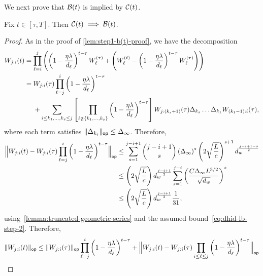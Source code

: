We next prove that $\cB(t)$ is implied by $\cC(t)$.
\begin{lemma}
  Fix $t \in [\tau, T]$. Then $\cC(t) \implies \cB(t)$.
\end{lemma}
\begin{proof}
As in the proof of \cref{lem:step1-b(t)-proof}, we have the decomposition
\begin{align*}
  W_{j:i}(t) & =
  \prod_{\ell = i}^j \left(\left(1 - \frac{\eta \lambda}{d_{\ell}}\right)^{t - \tau} W_{\ell}^{(\tau)} + \left(W_{\ell}^{(t)} - \left(1 - \frac{\eta \lambda}{d_{\ell}}\right)^{t - \tau} W_{\ell}^{(\tau)} \right)\right) \\
  &=
  \begin{aligned}[t]
    & W_{j:i}(\tau) \prod_{\ell = j}^{i} \left(1 - \frac{\eta \lambda}{d_{\ell}}\right)^{t - \tau} \\ 
    & + \sum_{i \leq k_1, \dots, k_s \leq j} \left[ \prod_{\ell \notin \set{k_1, \dots, k_{s}}} \left(1 - \frac{\eta \lambda}{d_{\ell}}\right)^{t - \tau} \right] W_{j:(k_s + 1)}(\tau) \Delta_{k_s}
		\dots \Delta_{k_1} W_{(k_1 - 1):i}(\tau),
  \end{aligned}
\end{align*}
where each term satisfies $\opnorm{\Delta_{k_{i}}} \leq \Delta_{\infty}$. Therefore,
\begin{align}
  \opnorm[\Big]{W_{j:i}(t) - W_{j:i}(\tau) \prod_{\ell = j}^{i} \left(1 - \frac{\eta \lambda}{d_{\ell}}\right)^{t - \tau}} & \leq
  \sum_{s = 1}^{j-i+1} \binom{j-i+1}{s} \left(\Delta_{\infty}\right)^{s} \left(2 \sqrt{\frac{L}{c}}\right)^{s+1} d_w^{\frac{j-i+1-s}{2}}                                                  \notag \\
		                                     & \leq
		\left(2\sqrt{\frac{L}{c}}\right) d_w^{\frac{j-i+1}{2}}
    \sum_{s = 1}^{j-i} \left(\frac{C \Delta_{\infty} L^{3/2}}{\sqrt{\dhid}}\right)^{s} \notag \\
		                                     & \leq
       \left(2\sqrt{\frac{L}{c}}\right) d_w^{\frac{j-i+1}{2}}
		\frac{1}{31}, 
	\end{align}
  using~\cref{lemma:truncated-geometric-series} and the assumed bound~\eqref{eq:dhid-lb-step-2}.
  Therefore,
  \begin{align*}
    \opnorm{W_{j:i}(t)} &\leq \opnorm{W_{j:i}(\tau)} \prod_{\ell = j}^{i} \left(1 - \frac{\eta \lambda}{d_{\ell}}\right)^{t - \tau}
  + \opnorm[\Big]{W_{j:i}(t) - W_{j:i}(\tau) \prod_{i \leq \ell \leq j} \left(1 - \frac{\eta \lambda}{d_{\ell}}\right)^{t - \tau}} \\

\end{align*}
\end{proof}
